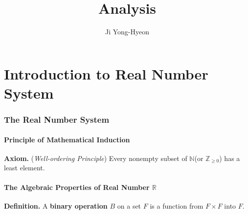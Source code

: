 \documentclass[12pt,a4paper]{article}
\author{Ji Yong-Hyeon}
\title{\bf\Huge Analysis}
\begin{document}
\maketitle
\tableofcontents
\newpage

\part{Introduction to Real Number System}

\section{The Real Number System}

\subsection{Principle of Mathematical Induction}
\begin{tcolorbox}[colback=white]
	\textbf{Axiom.} (\textit{Well-ordering Principle}) Every nonempty subset of $\mathbb{N}$(or $\mathbb{Z}_{\geq 0}$) has  a least element.
\end{tcolorbox}

\subsection{The Algebraic Properties of Real Number $\mathbb{R}$}
\begin{tcolorbox}[colback=white]
	\textbf{Definition.} A \textbf{binary operation} $B$ on a set $F$ is a function from $F\times F$ into $F$.
\end{tcolorbox}
\end{document}
